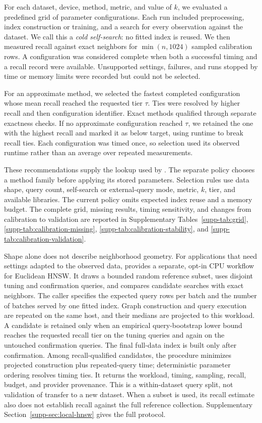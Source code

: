 \documentclass[article]{jss}
\newcommand{\fct}[1]{\code{#1()}}
\begin{document}
For each dataset, device, method, metric, and value of $k$, we evaluated a
predefined grid of parameter configurations. Each run included preprocessing,
index construction or training, and a search for every observation against
the dataset. We call this a \emph{cold self-search}: no fitted index is reused.
We then measured recall against exact neighbors for $\min(n,1024)$ sampled
calibration rows. A configuration was considered complete when both a
successful timing and a recall record were available. Unsupported settings,
failures, and runs stopped by time or memory limits were recorded but could
not be selected.

For an approximate method, we selected the fastest completed configuration
whose mean recall reached the requested tier $\tau$. Ties were resolved by
higher recall and then configuration identifier. Exact methods qualified
through separate exactness checks. If no approximate configuration reached
$\tau$, we retained the one with the highest recall and marked it as below
target, using runtime to break recall ties. Each configuration was timed
once, so selection used its observed runtime rather than an average over
repeated measurements.

These recommendations supply the lookup used by .
The separate  policy chooses a method family before
applying its stored parameters. Selection rules use data shape, query count,
self-search or external-query mode, metric, $k$, tier, and available libraries.
The current policy omits expected index reuse and a memory budget. The complete
grid, missing results, timing sensitivity, and changes from calibration to
validation are reported in Supplementary Tables~\ref{supp-tab:grid},
\ref{supp-tab:calibration-missing}, \ref{supp-tab:calibration-stability}, and
\ref{supp-tab:calibration-validation}.

Shape alone does not describe neighborhood geometry. For applications that
need settings adapted to the observed data, \fct{hnsw\_tune} provides a
separate, opt-in CPU workflow for Euclidean HNSW. It draws a bounded random
reference subset, uses disjoint tuning and confirmation queries, and compares
candidate searches with exact neighbors. The caller specifies the expected
query rows per batch and the number of batches served by one fitted index.
Graph construction and query execution are repeated on the same host, and
their medians are projected to this workload. A candidate is retained only
when an empirical
query-bootstrap lower bound reaches the requested recall tier on the tuning
queries and again on the untouched confirmation queries. The final full-data
index is built only after confirmation. Among recall-qualified candidates,
the procedure minimizes projected construction plus repeated-query time;
deterministic parameter ordering resolves timing ties. It returns the workload,
timing, sampling, recall, budget, and provider provenance.
This is a within-dataset query split, not validation of transfer to a new
dataset. When a subset is used, its recall estimate also does not establish
recall against the full reference collection. Supplementary
Section~\ref{supp-sec:local-hnsw} gives the full protocol.
\end{document}
